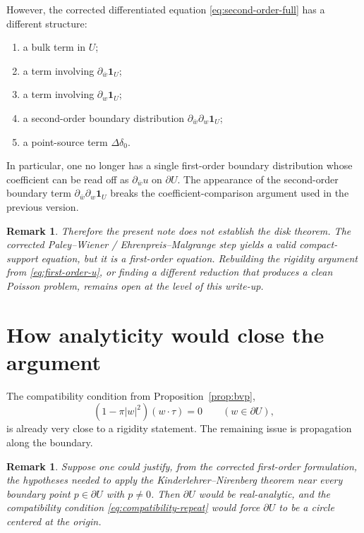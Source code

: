 \documentclass[11pt]{article}
\newtheorem{remark}[theorem]{Remark}
\newcommand{\1}{\mathbf 1}
\newcommand{\pw}{\partial_w}
\newcommand{\pwb}{\partial_{\bar w}}
\begin{document}
However, the corrected differentiated equation \eqref{eq:second-order-full} has a different
structure:
\begin{enumerate}[label=\textnormal{(\arabic*)}]
\item a bulk term in \(U\);
\item a term involving \(\pwb \1_U\);
\item a term involving \(\pw \1_U\);
\item a second-order boundary distribution \(\pwb\pw \1_U\);
\item a point-source term \(\Delta\delta_0\).
\end{enumerate}

In particular, one no longer has a single first-order boundary distribution whose coefficient
can be read off as \(\pwb u\) on \(\partial U\). The appearance of the second-order boundary
term \(\pwb\pw \1_U\) breaks the coefficient-comparison argument used in the previous version.

\begin{remark}
Therefore the present note does \emph{not} establish the disk theorem. The corrected
Paley--Wiener / Ehrenpreis--Malgrange step yields a valid compact-support equation, but it is
a first-order equation. Rebuilding the rigidity argument from \eqref{eq:first-order-u}, or
finding a different reduction that produces a clean Poisson problem, remains open at the
level of this write-up.
\end{remark}

\section{How analyticity would close the argument}

The compatibility condition from Proposition~\ref{prop:bvp},
\begin{equation}\label{eq:compatibility-repeat}
(1-\pi|w|^2)(w\cdot \tau)=0
\qquad (w\in \partial U),
\end{equation}
is already very close to a rigidity statement. The remaining issue is propagation along the
boundary.

\begin{remark}\label{rem:analytic-closure}
Suppose one could justify, from the corrected first-order formulation, the hypotheses needed to
apply the Kinderlehrer--Nirenberg theorem near every boundary point \(p\in \partial U\) with
\(p\neq 0\). Then \(\partial U\) would be real-analytic, and the compatibility condition
\eqref{eq:compatibility-repeat} would force \(\partial U\) to be a circle centered at the
origin.
\end{remark}
\end{document}
